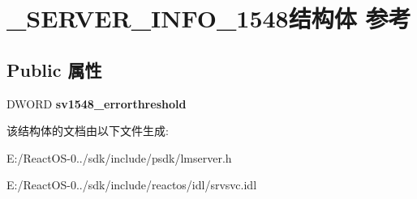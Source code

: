 \hypertarget{struct___s_e_r_v_e_r___i_n_f_o__1548}{}\section{\+\_\+\+S\+E\+R\+V\+E\+R\+\_\+\+I\+N\+F\+O\+\_\+1548结构体 参考}
\label{struct___s_e_r_v_e_r___i_n_f_o__1548}
\subsection*{Public 属性}
\begin{DoxyCompactItemize}
\item 
\mbox{\label{struct___s_e_r_v_e_r___i_n_f_o__1548_adeb181ddde7fed5629cd8e29327f6e9c}} 
D\+W\+O\+RD {\bfseries sv1548\+\_\+errorthreshold}
\end{DoxyCompactItemize}


该结构体的文档由以下文件生成\+:\begin{DoxyCompactItemize}
\item 
E\+:/\+React\+O\+S-\/0../sdk/include/psdk/lmserver.\+h\item 
E\+:/\+React\+O\+S-\/0../sdk/include/reactos/idl/srvsvc.\+idl\end{DoxyCompactItemize}
